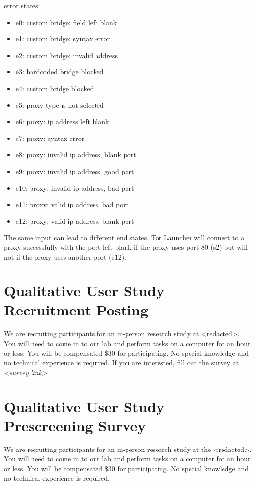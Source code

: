 \documentclass[USenglish,oneside,twocolumn]{article}
\begin{document}
error states:
\begin{itemize} 
\item e0: custom bridge: field left blank
\item e1: custom bridge: syntax error
\item e2: custom bridge: invalid address
\item e3: hardcoded bridge blocked
\item e4: custom bridge blocked
\item e5: proxy type is not selected
\item e6: proxy: ip address left blank
\item e7: proxy: syntax error
\item e8: proxy: invalid ip address, blank port
\item e9: proxy: invalid ip address, good port
\item e10: proxy: invalid ip address, bad port
\item e11: proxy: valid ip address, bad port
\item e12: proxy: valid ip address, blank port
\end{itemize} 

The same input can lead to different end states. Tor Launcher will connect to a proxy successfully with the port left blank if the proxy uses port 80 (s2) but will not if the proxy uses another port (e12). 

\section{Qualitative User Study Recruitment Posting} 
\label{qualitative-recruitment}
We are recruiting participants for an in-person research study at <redacted>. %
You will need to come in to our lab and perform tasks on a computer for an hour or less. You will be compensated \$30 for participating. 
No special knowledge and no technical experience is required. If you are interested, fill out the survey at \textit{<survey link>}. 

\section{Qualitative User Study Prescreening Survey} 
\label{qualitative-prescreening}
We are recruiting participants for an in-person research study at the <redacted>. %
You will need to come in to our lab and perform tasks on a computer for an hour or less. You will be compensated \$30 for participating. No special knowledge and no technical experience is required.\\
\end{document}
